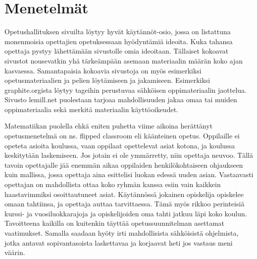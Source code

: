 \documentclass[utf8,bachelor]{gradu3}
\begin{document}
\section{Menetelmät}
Opetushallituksen sivuilta löytyy hyvät käytännöt-osio, jossa on listattuna monenmoisia opettajien opetuksessaan hyödyntämiä ideoita. \parencite[][]{hyvatkaytannot} Kuka tahansa opettaja pystyy lähettämään sivustolle omia ideoitaan. Tällaiset kokoavat sivustot nousevatkin yhä tärkeämpään asemaan materiaalin määrän koko ajan kasvaessa. Samantapaisia kokoavia sivustoja on myös esimerkiksi opetusmateriaalien ja pelien löytämiseen ja jakamiseen. Esimerkiksi graphite.orgista löytyy tageihin perustuvaa sähköisen oppimateriaalin jaottelua. Sivusto lemill.net puolestaan tarjoaa mahdollisuuden jakaa omaa tai muiden oppimateriaalia sekä merkitä materiaalin käyttöoikeudet.

Matematiikan puolella \parencite[][]{maot} ehkä eniten puhetta viime aikoina herättänyt opetusmenetelmä on ns. flipped classroom eli käänteinen opetus.\parencite[][]{flipped} Oppilaille ei opeteta asioita koulussa, vaan oppilaat opettelevat asiat kotona, ja koulussa keskitytään laskemiseen. Jos jotain ei ole ymmärretty, niin opettaja neuvoo. Tällä tavoin opettajalle jää enemmän aikaa oppilaiden henkilökohtaiseen ohjaukseen kuin mallissa, jossa opettaja aina esittelisi luokan edessä uuden asian. Vastaavasti opettajan on mahdollista ottaa koko ryhmän kanssa esiin vain kaikkein haastavimmiksi osoittautuneet asiat. Käytännössä jokainen opiskelija opiskelee omaan tahtiinsa, ja opettaja auttaa tarvittaessa. Tämä myös rikkoo perinteisiä kurssi- ja vuosiluokkarajoja ja opiskelijoiden oma tahti jatkuu läpi koko koulun. Tavoitteena kaikilla on kuitenkin täyttää opetussuunnitelman asettamat vaatimukset. Samalla saadaan hyöty irti mahdollisista sähköisistä ohjelmista, jotka antavat sopivantasoista laskettavaa ja korjaavat heti jos vastaus meni väärin.


\end{document}
